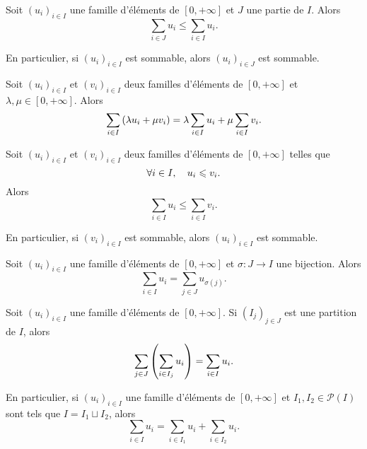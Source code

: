\documentclass{magnolia}
\begin{document}
\begin{proposition}
Soit $(u_i)_{i\in I}$ une famille d'éléments de $[0,+\infty]$ et $J$ une partie de
  $I$. Alors
  \[\sum_{i\in J} u_i \leq \sum_{i\in I} u_i.\]  
\end{proposition}

\begin{remarqueUnique}
\remarque En particulier, si $(u_i)_{i\in I}$ est sommable, alors $(u_i)_{i\in J}$ est sommable.
\end{remarqueUnique}



\begin{proposition}
Soit $(u_i)_{i\in I}$ et $(v_i)_{i\in I}$ deux familles d'éléments de $[0,+\infty]$ et $\lambda,\mu\in[0,+\infty]$.
Alors
\[\sum_{i\in I} \left(\lambda u_i+\mu v_i\right)=\lambda \sum_{i\in I} u_i + \mu \sum_{i\in I} v_i.\]
\end{proposition}

  

\begin{proposition}
Soit $(u_i)_{i\in I}$ et $(v_i)_{i\in I}$ deux familles d'éléments de $[0,+\infty]$
telles que
\[\forall i\in I,\quad u_i\leqslant v_i.\]
Alors
\[\sum_{i\in I} u_i \leq \sum_{i\in I} v_i.\]
\end{proposition}

\begin{remarqueUnique}
\remarque En particulier, si $(v_i)_{i\in I}$ est sommable, alors $(u_i)_{i\in I}$ est sommable.
\end{remarqueUnique}


\begin{proposition}
Soit $(u_i)_{i\in I}$ une famille d'éléments de $[0,+\infty]$ et $\sigma:J\to I$ une bijection.
Alors
\[\sum_{i\in I} u_i=\sum_{j\in J} u_{\sigma(j)}.\]
\end{proposition}


\begin{proposition}[nom={Théorème de sommation par paquets}]
Soit $(u_i)_{i\in I}$ une famille d'éléments de $[0,+\infty]$. Si $(I_j)_{j\in J}$ est
une partition de $I$, alors
\[\sum_{j\in J} \left(\sum_{i\in I_j} u_i\right)=\sum_{i\in I} u_i.\]
\end{proposition}

\begin{remarqueUnique}
\remarque En particulier, si $(u_i)_{i\in I}$ une famille d'éléments de $[0,+\infty]$ et
    $I_1,I_2\in\mathcal{P}(I)$ sont tels que $I=I_1 \sqcup I_2$, alors
    \[\sum_{i\in I} u_i = \sum_{i\in I_1} u_i + \sum_{i\in I_2} u_i.\]
\end{remarqueUnique}
\end{document}
